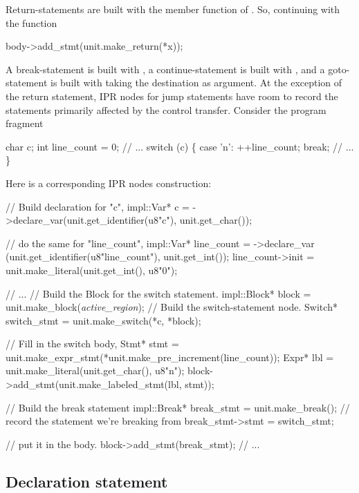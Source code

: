 \documentclass[11pt]{article}
\begin{document}
Return-statements are built with the member function  of 
. So, continuing with the  function
\begin{Program}
body->add_stmt(unit.make_return(*x));  
\end{Program}

A break-statement is built with , a continue-statement
is built with , and a goto-statement is built with
 taking the destination as argument. At the exception of
the return statement, IPR nodes for jump statements have room to record the
statements primarily affected by the control transfer.  Consider the program
fragment 
\begin{Program}
  char c;
  int line_count = 0;
  // ...
  switch (c) \{
    case '{\bslash}n':
      ++line_count;
      break;
    // ...
  \}
\end{Program}

Here is a corresponding IPR nodes construction:
\begin{Program}
  // Build declaration for "c",
  impl::Var* c = ->declare_var(unit.get_identifier(u8"c"),
                                                   unit.get_char());

  // do the same for "line_count", 
  impl::Var* line_count = ->declare_var
     (unit.get_identifier(u8"line_count"), unit.get_int());
  line_count->init = unit.make_literal(unit.get_int(), u8"0");

  // ...
  // Build the Block for the switch statement.
  impl::Block* block = unit.make_block(\textit{active_region});
  // Build the switch-statement node.
  Switch* switch_stmt = unit.make_switch(*c, *block);

  // Fill in the switch body,
  Stmt* stmt = unit.make_expr_stmt(*unit.make_pre_increment(line_count));
  Expr* lbl = unit.make_literal(unit.get_char(), u8"{\bslash}n");
  block->add_stmt(unit.make_labeled_stmt(lbl, stmt));

    // Build the break statement
  impl::Break* break_stmt = unit.make_break();
    // record the statement we're breaking from
  break_stmt->stmt = switch_stmt;

    // put it in the body.
  block->add_stmt(break_stmt);
  // ...
\end{Program}


\subsection{Declaration statement}
\label{sec:stmt.declaration}
\end{document}
